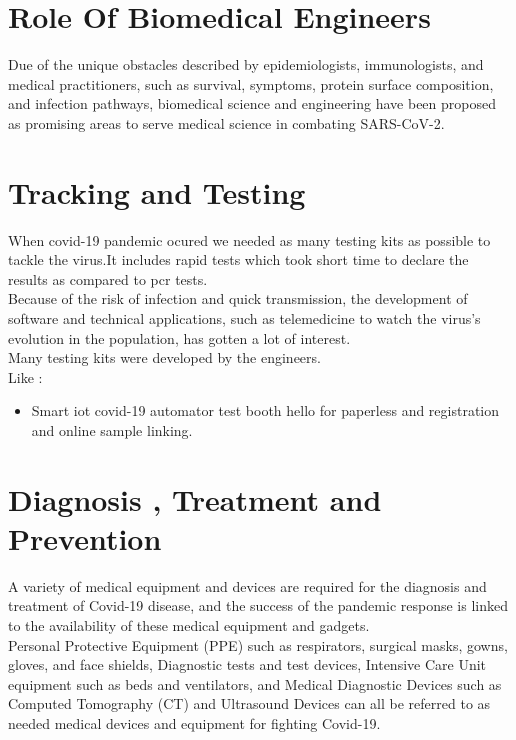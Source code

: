 \documentclass[12pt]{article}
\begin{document}
\Large
\raggedright
\section*{ \Huge Role Of Biomedical Engineers }
Due of the unique obstacles described by epidemiologists, immunologists, and medical practitioners, such as survival, symptoms, protein surface composition, and infection pathways, biomedical science and engineering have been proposed as promising areas to serve medical science in combating SARS-CoV-2.

\section*{ \LARGE Tracking and Testing }
\Large 
When covid-19 pandemic ocured we needed as many testing kits as possible to tackle the virus.It includes rapid tests which took short time to declare the results as compared to pcr tests.
\\Because of the risk of infection and quick transmission, the development of software and technical applications, such as telemedicine to watch the virus's evolution in the population, has gotten a lot of interest.
\vspace{3mm}
\\Many testing kits were developed by the engineers.\\
Like : 
\begin{itemize}
\item Smart iot covid-19 automator test booth hello for paperless and registration and online sample linking.

\end{itemize}

\section*{ \LARGE Diagnosis , Treatment and Prevention }
\Large
A variety of medical equipment and devices are required for the diagnosis and treatment of Covid-19 disease, and the success of the pandemic response is linked to the availability of these medical equipment and gadgets.\\
\vspace{4mm}
Personal Protective Equipment (PPE) such as respirators, surgical masks, gowns, gloves, and face shields, Diagnostic tests and test devices, Intensive Care Unit equipment such as beds and ventilators, and Medical Diagnostic Devices such as Computed Tomography (CT) and Ultrasound Devices can all be referred to as needed medical devices and equipment for fighting Covid-19.\\
\end{document}
